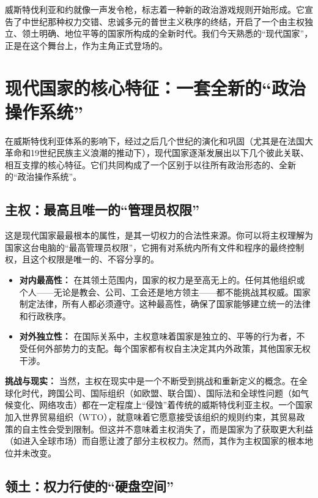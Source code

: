 威斯特伐利亚和约就像一声发令枪，标志着一种新的政治游戏规则开始形成。它宣告了中世纪那种权力交错、忠诚多元的普世主义秩序的终结，开启了一个由主权独立、领土明确、地位平等的国家所构成的全新时代。我们今天熟悉的“现代国家”，正是在这个舞台上，作为主角正式登场的。

\hrulefill

\section{现代国家的核心特征：一套全新的“政治操作系统”}

在威斯特伐利亚体系的影响下，经过之后几个世纪的演化和巩固（尤其是在法国大革命和19世纪民族主义浪潮的推动下），现代国家逐渐发展出以下几个彼此关联、相互支撑的核心特征。它们共同构成了一个区别于以往所有政治形态的、全新的“政治操作系统”。

\subsection{主权：最高且唯一的“管理员权限”}

这是现代国家最最根本的属性，是其一切权力的合法性来源。你可以将主权理解为国家这台电脑的“最高管理员权限”，它拥有对系统内所有文件和程序的最终控制权，且这个权限是唯一的、不容分享的。

\begin{itemize}
    \item \textbf{对内最高性：} 在其领土范围内，国家的权力是至高无上的。任何其他组织或个人——无论是教会、公司、工会还是地方领主——都不能挑战其权威。国家制定法律，所有人都必须遵守。这种最高性，确保了国家能够建立统一的法律和行政秩序。
    \item \textbf{对外独立性：} 在国际关系中，主权意味着国家是独立的、平等的行为者，不受任何外部势力的支配。每个国家都有权自主决定其内外政策，其他国家无权干涉。
\end{itemize}

\textbf{挑战与现实：} 当然，主权在现实中是一个不断受到挑战和重新定义的概念。在全球化时代，跨国公司、国际组织（如欧盟、联合国）、国际法和全球性问题（如气候变化、网络攻击）都在一定程度上“侵蚀”着传统的威斯特伐利亚主权。一个国家加入世界贸易组织（WTO），就意味着它愿意接受该组织的规则约束，其贸易政策的自主性会受到限制。但这并不意味着主权消失了，而是国家为了获取更大利益（如进入全球市场）而自愿让渡了部分主权权力。然而，其作为主权国家的根本地位并未改变。

\subsection{领土：权力行使的“硬盘空间”}


